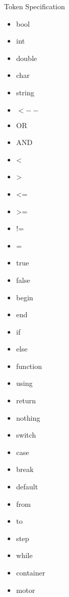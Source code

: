 


Token Specification 

\begin{itemize}

\item bool
\item int
\item double
\item char
\item string
\item $<--$
\item OR
\item AND
\item <
\item >
\item <=
\item >=
\item !=
\item =
\item true
\item false
\item begin
\item end
\item if
\item else
\item function
\item using
\item return
\item nothing
\item switch
\item case
\item break
\item default
\item from
\item to
\item step
\item while



\item container
\item motor
\end{itemize}
